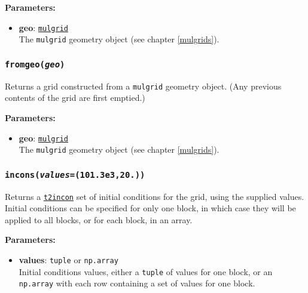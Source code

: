 \textbf{Parameters:}
\begin{itemize}
\item \textbf{geo}: \hyperref[mulgrids]{\texttt{mulgrid}}\\
  The \texttt{mulgrid} geometry object (see chapter \ref{mulgrids}).
\end{itemize}

\begin{snugshade}
\subsubsection{\texttt{fromgeo(\emph{geo})}}
\end{snugshade}
\label{sec:t2grid:fromgeo}

Returns a grid constructed from a \texttt{mulgrid} geometry object.  (Any previous contents of the grid are first emptied.)

\textbf{Parameters:}
\begin{itemize}
\item \textbf{geo}: \hyperref[mulgrids]{\texttt{mulgrid}}\\
  The \texttt{mulgrid} geometry object (see chapter \ref{mulgrids}).
\end{itemize}

\begin{snugshade}
\subsubsection{\texttt{incons(\emph{values}=(101.3e3,20.))}}
\end{snugshade}
\label{sec:t2grid:incons}

Returns a \hyperref[incons]{\texttt{t2incon}} set of initial conditions for the grid, using the supplied values.  Initial conditions can be specified for only one block, in which case they will be applied to all blocks, or for each block, in an array.

\textbf{Parameters:}
\begin{itemize}
\item \textbf{values}: \texttt{tuple} or \texttt{np.array}\\
  Initial conditions values, either a \texttt{tuple} of values for one block, or an \texttt{np.array} with each row containing a set of values for one block. 
\end{itemize}


